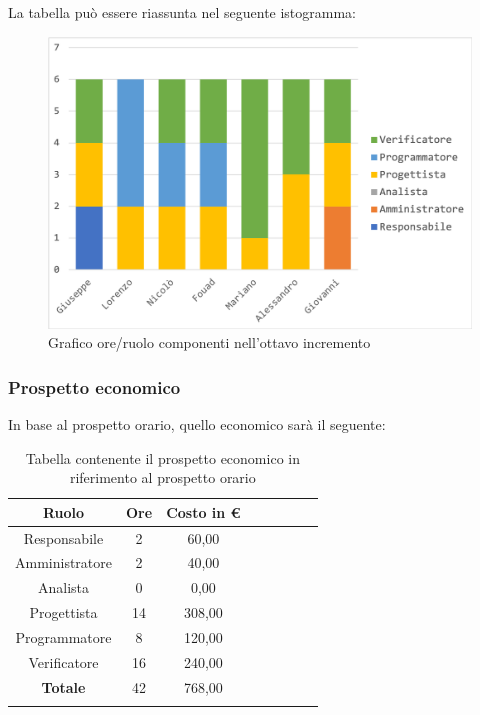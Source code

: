 		La tabella può essere riassunta nel seguente istogramma:
		\begin{figure}[H]
			\centering
			\includegraphics[width=0.8\linewidth]{./images/preventivo/incremento8-1.png}
			\caption{Grafico ore/ruolo componenti nell'ottavo incremento}
			\label{fig:grafico suddivione ruoli incremento VIII}
		\end{figure}
		
		\subsubsection{Prospetto economico}
		In base al prospetto orario, quello economico sarà il seguente: 
		
		\begin{longtable}{|c|c|c|c|c|c|c|c|}
			\hline
			\rowcolor{lighter-grayer}
			\textbf{Ruolo} & \textbf{Ore} & \textbf{Costo in € } \\
			\hline
			\endfirsthead
			
			\hline
			Responsabile 	    & 2 & 60,00\\
			\hline 
			\hline
			Amministratore	   & 2 & 40,00\\
			\hline
			\hline
			Analista 				& 0 & 0,00\\
			\hline
			\hline
			Progettista 		   & 14 & 308,00\\
			\hline
			\hline
			Programmatore 	  & 8 & 120,00\\
			\hline
			\hline
			Verificatore 		   & 16 & 240,00\\
			\hline
			\textbf{Totale} 	 & 42 & 768,00\\
			\hline
			\caption{Tabella contenente il prospetto economico in riferimento al prospetto orario}
		\end{longtable}
		\pagebreak
		
